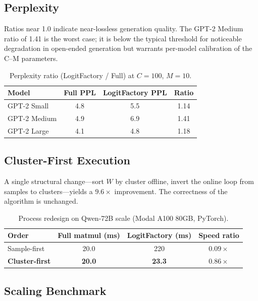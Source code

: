 \documentclass[11pt]{article}
\begin{document}
\subsection{Perplexity}

Ratios near 1.0 indicate near-lossless generation quality. The GPT-2 Medium ratio of 1.41 is the worst case; it is below the typical threshold for noticeable degradation in open-ended generation but warrants per-model calibration of the C--M parameters.

\begin{table}[h]
\centering
\caption{Perplexity ratio (LogitFactory / Full) at $C = 100$, $M = 10$.}
\label{tab:perplexity}
\begin{tabular}{lccc}
\toprule
Model         & Full PPL & LogitFactory PPL & Ratio \\
\midrule
GPT-2 Small   & 4.8      & 5.5              & 1.14  \\
GPT-2 Medium  & 4.9      & 6.9              & 1.41  \\
GPT-2 Large   & 4.1      & 4.8              & 1.18  \\
\bottomrule
\end{tabular}
\end{table}

\subsection{Cluster-First Execution}

A single structural change---sort $W$ by cluster offline, invert the online loop from samples to clusters---yields a $9.6\times$ improvement. The correctness of the algorithm is unchanged.

\begin{table}[h]
\centering
\caption{Process redesign on Qwen-72B scale (Modal A100 80GB, PyTorch).}
\label{tab:execution}
\begin{tabular}{lccc}
\toprule
Order          & Full matmul (ms) & LogitFactory (ms) & Speed ratio \\
\midrule
Sample-first   & 20.0             & 220               & $0.09\times$ \\
\textbf{Cluster-first} & \textbf{20.0} & \textbf{23.3}     & $\mathbf{0.86\times}$ \\
\bottomrule
\end{tabular}
\end{table}

\subsection{Scaling Benchmark}
\end{document}
